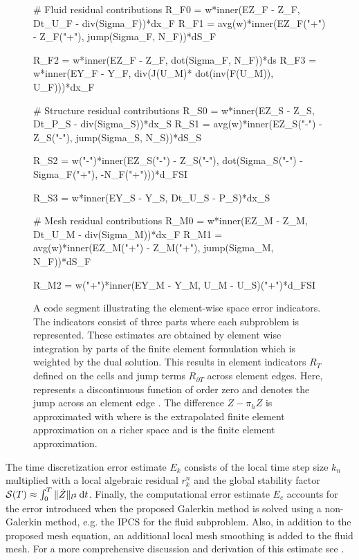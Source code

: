 \begin{figure}
\bwfig
\begin{python}
# Fluid residual contributions
R_F0 = w*inner(EZ_F - Z_F, Dt_U_F - div(Sigma_F))*dx_F
R_F1 = avg(w)*inner(EZ_F("+") - Z_F("+"),
              jump(Sigma_F, N_F))*dS_F

R_F2 = w*inner(EZ_F - Z_F, dot(Sigma_F, N_F))*ds
R_F3 = w*inner(EY_F - Y_F, div(J(U_M)*
         dot(inv(F(U_M)), U_F)))*dx_F

# Structure residual contributions
R_S0 = w*inner(EZ_S - Z_S, Dt_P_S - div(Sigma_S))*dx_S
R_S1 = avg(w)*inner(EZ_S("-") - Z_S("-"),
             jump(Sigma_S, N_S))*dS_S

R_S2 = w("-")*inner(EZ_S("-") - Z_S("-"),
             dot(Sigma_S("-") - Sigma_F("+"),
             -N_F("+")))*d_FSI

R_S3 = w*inner(EY_S - Y_S, Dt_U_S - P_S)*dx_S

# Mesh residual contributions
R_M0 = w*inner(EZ_M - Z_M, Dt_U_M - div(Sigma_M))*dx_F
R_M1 = avg(w)*inner(EZ_M("+") - Z_M("+"),
              jump(Sigma_M, N_F))*dS_F

R_M2 = w("+")*inner(EY_M - Y_M, U_M - U_S)("+")*d_FSI
\end{python}
\caption{A code segment illustrating the element-wise space error
  indicators. The indicators consist of three parts where each
  subproblem is represented. These estimates are obtained by element
  wise integration by parts of the finite element formulation which is
  weighted by the dual solution. This results in element indicators
  $R_T$ defined on the cells and jump terms $R_{\partial T}$ across
  element edges. Here,  represents a discontinuous function of
  order zero and  denotes the jump across an element edge
  . The difference $Z -\pi_h Z$ is approximated with  where  is the extrapolated finite element approximation
  on a richer space and  is the finite element approximation.}
\label{selim:fig:strong_residuals}
\end{figure}
The time discretization error estimate $E_k$ consists of the local time
step size $k_n$ multiplied with a local algebraic residual
$r_k^n$ and the global stability factor $\mathcal{S}(T) \approx
\int_0^T \| \dot{Z} \|_{l^2}\, \mathrm{d}t$. Finally, the computational error
estimate $E_c$ accounts for the error introduced when the proposed
Galerkin method is solved using a non-Galerkin method, e.g. the IPCS
for the fluid subproblem. Also, in addition to the proposed mesh
equation, an additional local mesh smoothing is added to the fluid
mesh.  For a more comprehensive discussion and derivation of this
\apost{} estimate see \citet{SelimLogg2011a}.

